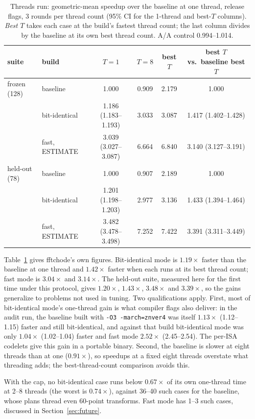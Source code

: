 \documentclass[10pt]{article}
\theoremstyle{definition}
\begin{document}
\begin{table}[t]
\centering\small
\begin{tabular}{llcccc}
\toprule
suite & build & $T=1$ & $T=8$ & best $T$ & best $T$ vs.\ baseline best $T$\\
\midrule
frozen (128) & baseline & 1.000 & 0.909 & 2.179 & 1.000\\
 & bit-identical & 1.186 (1.183--1.193) & 3.033 & 3.087 & 1.417 (1.402--1.428)\\
 & fast, ESTIMATE & 3.039 (3.027--3.087) & 6.664 & 6.840 & 3.140 (3.127--3.191)\\
\midrule
held-out (78) & baseline & 1.000 & 0.907 & 2.189 & 1.000\\
 & bit-identical & 1.201 (1.198--1.203) & 2.977 & 3.136 & 1.433 (1.394--1.464)\\
 & fast, ESTIMATE & 3.482 (3.478--3.498) & 7.252 & 7.422 & 3.391 (3.311--3.449)\\
\bottomrule
\end{tabular}
\caption{Threads run: geometric-mean speedup over the baseline at one thread, release flags, 3 rounds per thread count (95\% CI for the 1-thread and best-$T$ columns). \emph{Best $T$} takes each case at the build's fastest thread count; the last column divides by the baseline at its own best thread count. A/A control 0.994--1.014.}\label{tab:headline}
\end{table}

Table~\ref{tab:headline} gives fftchode's own figures. Bit-identical mode is $1.19\times$ faster than the baseline at one thread and $1.42\times$ faster when each runs at its best thread count; fast mode is $3.04\times$ and $3.14\times$. The held-out suite, measured here for the first time under this protocol, gives $1.20\times$, $1.43\times$, $3.48\times$ and $3.39\times$, so the gains generalize to problems not used in tuning. Two qualifications apply. First, most of bit-identical mode's one-thread gain is what compiler flags also deliver: in the audit run, the baseline built with \texttt{-O3 -march=znver4} was itself $1.13\times$ (1.12--1.15) faster and still bit-identical, and against that build bit-identical mode was only $1.04\times$ (1.02--1.04) faster and fast mode $2.52\times$ (2.45--2.54). The per-ISA codelets give this gain in a portable binary. Second, the baseline is slower at eight threads than at one ($0.91\times$), so speedups at a fixed eight threads overstate what threading adds; the best-thread-count comparison avoids this.

With the cap, no bit-identical case runs below $0.67\times$ of its own one-thread time at 2--8 threads (the worst is $0.74\times$), against 36--40 such cases for the baseline, whose plans thread even 60-point transforms. Fast mode has 1--3 such cases, discussed in Section~\ref{sec:future}.
\end{document}

